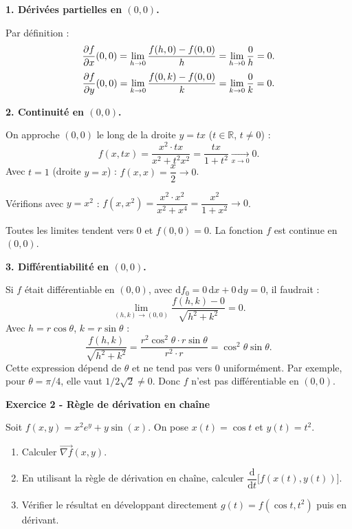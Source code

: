 \documentclass[12pt,a4paper]{article}
\begin{document}
\begin{boitecorrige}
\textbf{1. Dérivées partielles en $(0,0)$.}

Par définition :
\[
\dfrac{\partial f}{\partial x}(0,0) = \lim_{h \to 0} \frac{f(h,0) - f(0,0)}{h} = \lim_{h \to 0} \frac{0}{h} = 0.
\]
\[
\dfrac{\partial f}{\partial y}(0,0) = \lim_{k \to 0} \frac{f(0,k) - f(0,0)}{k} = \lim_{k \to 0} \frac{0}{k} = 0.
\]

\textbf{2. Continuité en $(0,0)$.}

On approche $(0,0)$ le long de la droite $y = tx$ ($t \in \mathbb{R}$, $t \neq 0$) :
\[
f(x, tx) = \frac{x^2 \cdot tx}{x^2 + t^2x^2} = \frac{tx}{1 + t^2} \xrightarrow[x \to 0]{} 0.
\]
Avec $t = 1$ (droite $y=x$) : $f(x,x) = \dfrac{x}{2} \to 0$.

Vérifions avec $y = x^2$ : $f(x, x^2) = \dfrac{x^2 \cdot x^2}{x^2 + x^4} = \dfrac{x^2}{1+x^2} \to 0$.

Toutes les limites tendent vers 0 et $f(0,0) = 0$. La fonction $f$ est continue en $(0,0)$.

\textbf{3. Différentiabilité en $(0,0)$.}

Si $f$ était différentiable en $(0,0)$, avec $\mathrm{d}f_0 = 0\,\mathrm{d}x + 0\,\mathrm{d}y = 0$, il faudrait :
\[
\lim_{(h,k)\to(0,0)} \frac{f(h,k) - 0}{\sqrt{h^2+k^2}} = 0.
\]
Avec $h = r\cos\theta$, $k = r\sin\theta$ :
\[
\frac{f(h,k)}{\sqrt{h^2+k^2}} = \frac{r^2\cos^2\theta \cdot r\sin\theta}{r^2 \cdot r} = \cos^2\theta\sin\theta.
\]
Cette expression dépend de $\theta$ et ne tend pas vers $0$ uniformément. Par exemple, pour $\theta = \pi/4$, elle vaut $1/2\sqrt{2} \neq 0$. Donc $f$ n'est pas différentiable en $(0,0)$.
\end{boitecorrige}

\begin{boiteexercice}
\textbf{Exercice 2 - Règle de dérivation en chaîne}\niveau{\facile}

Soit $f(x,y) = x^2 e^y + y\sin(x)$. On pose $x(t) = \cos t$ et $y(t) = t^2$.

\begin{enumerate}
  \item Calculer $\overrightarrow{\nabla f}(x,y)$.
  \item En utilisant la règle de dérivation en chaîne, calculer $\dfrac{\mathrm{d}}{\mathrm{d}t}\bigl[f(x(t), y(t))\bigr]$.
  \item Vérifier le résultat en développant directement $g(t) = f(\cos t, t^2)$ puis en dérivant.
\end{enumerate}
\end{boiteexercice}
\end{document}
